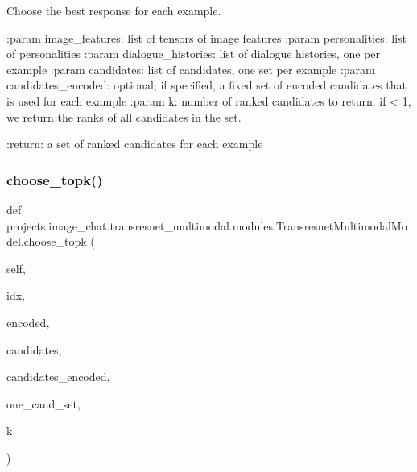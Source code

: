 \begin{DoxyVerb}Choose the best response for each example.

:param image_features:
    list of tensors of image features
:param personalities:
    list of personalities
:param dialogue_histories:
    list of dialogue histories, one per example
:param candidates:
    list of candidates, one set per example
:param candidates_encoded:
    optional; if specified, a fixed set of encoded candidates that is
    used for each example
:param k:
    number of ranked candidates to return. if < 1, we return the ranks
    of all candidates in the set.

:return:
    a set of ranked candidates for each example
\end{DoxyVerb}
 \mbox{\label{classprojects_1_1image__chat_1_1transresnet__multimodal_1_1modules_1_1TransresnetMultimodalModel_a16771c029f996c0aa05a773000e40a11}} 
\subsubsection{\texorpdfstring{choose\+\_\+topk()}{choose\_topk()}}
{\footnotesize\ttfamily def projects.\+image\+\_\+chat.\+transresnet\+\_\+multimodal.\+modules.\+Transresnet\+Multimodal\+Model.\+choose\+\_\+topk (\begin{DoxyParamCaption}\item[{}]{self,  }\item[{}]{idx,  }\item[{}]{encoded,  }\item[{}]{candidates,  }\item[{}]{candidates\+\_\+encoded,  }\item[{}]{one\+\_\+cand\+\_\+set,  }\item[{}]{k }\end{DoxyParamCaption})}

